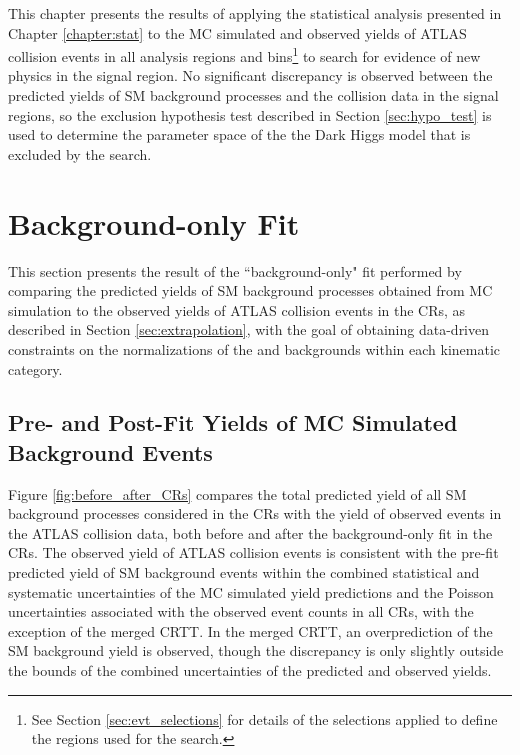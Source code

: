 \label{chapter:results}

This chapter presents the results of applying the statistical analysis presented in Chapter \ref{chapter:stat} to the MC simulated and observed yields of ATLAS collision events in all analysis regions and bins\footnote{See Section \ref{sec:evt_selections} for details of the selections applied to define the regions used for the search.} to search for evidence of new physics in the signal region. No significant discrepancy is observed between the predicted yields of SM background processes and the collision data in the signal regions, so the exclusion hypothesis test described in Section \ref{sec:hypo_test} is used to determine the parameter space of the the Dark Higgs model that is excluded by the search.


\section{Background-only Fit}

This section presents the result of the ``background-only" fit performed by comparing the predicted yields of SM background processes obtained from MC simulation to the observed yields of ATLAS collision events in the CRs, as described in Section \ref{sec:extrapolation}, with the goal of obtaining data-driven constraints on the normalizations of the \wjets and \ttbar backgrounds within each kinematic category.

\subsection{Pre- and Post-Fit Yields of MC Simulated Background Events}

Figure \ref{fig:before_after_CRs} compares the total predicted yield of all SM background processes considered in the CRs with the yield of observed events in the ATLAS collision data, both before and after the background-only fit in the CRs. The observed yield of ATLAS collision events is consistent with the pre-fit predicted yield of SM background events within the combined statistical and systematic uncertainties of the MC simulated yield predictions and the Poisson uncertainties associated with the observed event counts in all CRs, with the exception of the merged CRTT. In the merged CRTT, an overprediction of the SM background yield is observed, though the discrepancy is only slightly outside the bounds of the combined uncertainties of the predicted and observed yields. 

